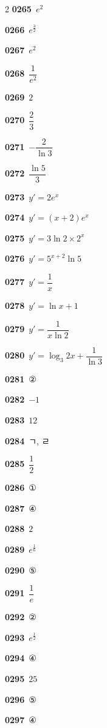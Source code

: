 \documentclass[10pt,a4paper]{article}
\begin{document}
\begin{multicols}{2}
\noindent\textbf{0265}\ $e^2$\par
\noindent\textbf{0266}\ $e^{\frac{3}{2}}$\par
\noindent\textbf{0267}\ $e^2$\par
\noindent\textbf{0268}\ $\dfrac{1}{e^2}$\par
\noindent\textbf{0269}\ $2$\par
\noindent\textbf{0270}\ $\dfrac{2}{3}$\par
\noindent\textbf{0271}\ $-\dfrac{2}{\ln 3}$\par
\noindent\textbf{0272}\ $\dfrac{\ln 5}{3}$\par
\noindent\textbf{0273}\ $y'=2e^x$\par
\noindent\textbf{0274}\ $y'=(x+2)e^x$\par
\noindent\textbf{0275}\ $y'=3\ln 2\times 2^x$\par
\noindent\textbf{0276}\ $y'=5^{x+2}\ln 5$\par
\noindent\textbf{0277}\ $y'=\dfrac{1}{x}$\par
\noindent\textbf{0278}\ $y'=\ln x+1$\par
\noindent\textbf{0279}\ $y'=\dfrac{1}{x\ln 2}$\par
\noindent\textbf{0280}\ $y'=\log_3 2x+\dfrac{1}{\ln 3}$\par
\noindent\textbf{0281}\ ②\par
\noindent\textbf{0282}\ $-1$\par
\noindent\textbf{0283}\ $12$\par
\noindent\textbf{0284}\ ㄱ, ㄹ\par
\noindent\textbf{0285}\ $\dfrac{1}{2}$\par
\noindent\textbf{0286}\ ①\par
\noindent\textbf{0287}\ ④\par
\noindent\textbf{0288}\ $2$\par
\noindent\textbf{0289}\ $e^{\frac{1}{6}}$\par
\noindent\textbf{0290}\ ⑤\par
\noindent\textbf{0291}\ $\dfrac{1}{e}$\par
\noindent\textbf{0292}\ ②\par
\noindent\textbf{0293}\ $e^{\frac{1}{2}}$\par
\noindent\textbf{0294}\ ④\par
\noindent\textbf{0295}\ $25$\par
\noindent\textbf{0296}\ ⑤\par
\noindent\textbf{0297}\ ④\par

\end{multicols}
\end{document}
